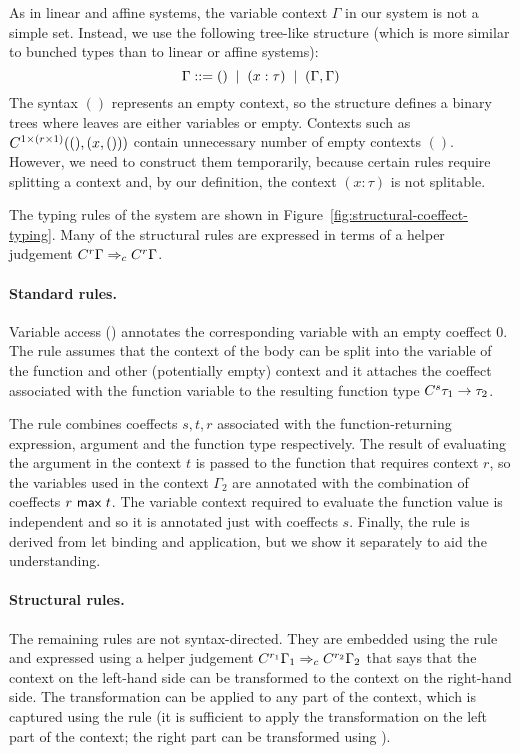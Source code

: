 As in linear and affine systems, the variable context $\Gamma$ in our system is not a 
simple set. Instead, we use the following tree-like structure (which is more similar to 
bunched types than to linear or affine systems):
%
\begin{equation*}
\Gamma ::= () \;\; | \;\; (x:\tau) \;\; | \;\; (\Gamma, \Gamma)
\end{equation*}
%
The syntax $()$ represents an empty context, so the structure defines a binary trees where
leaves are either variables or empty. Contexts such as $C^{1\times(r \times 1)}((), (x, ()))$ 
contain unnecessary number of empty contexts $()$. However, we need to construct them
temporarily, because certain rules require splitting a context and, by our 
definition, the context $(x:\tau)$ is not splitable.

The typing rules of the system are shown in Figure~\ref{fig:structural-coeffect-typing}.
Many of the structural rules are expressed in terms of a helper judgement
$C^{r}\Gamma \Rightarrow_c C^{r}\Gamma$.

\paragraph{Standard rules.}
Variable access () annotates the corresponding variable with an empty coeffect
$0$. The  rule assumes that the context of the body can be split into the
variable of the function and other (potentially empty) context and it attaches the coeffect
associated with the function variable to the resulting function type $C^{s}\tau_1 \rightarrow \tau_2$.

The  rule combines coeffects $s, t, r$ associated with the function-returning
expression, argument and the function type respectively. 
The result of evaluating the argument in the context $t$ is passed to the function that
requires context $r$, so the variables used in the context $\Gamma_2$ are annotated with
the combination of coeffects $r ~\textnormal{\sffamily max}~ t$. The variable context required to evaluate the 
function value is independent and so it is annotated just with coeffects $s$.
Finally, the  rule is derived from let binding and application, but we show
it separately to aid the understanding.


\paragraph{Structural rules.}
The remaining rules are not syntax-directed. They are embedded using the 
rule and expressed using a helper judgement $C^{r_1}\Gamma_1 \Rightarrow_c C^{r_2}\Gamma_2$
that says that the context on the left-hand side can be transformed to the context on the
right-hand side. The transformation can be applied to any part of the context, which 
is captured using the  rule (it is sufficient to apply the transformation 
on the left part of the context; the right part can be transformed using ).

